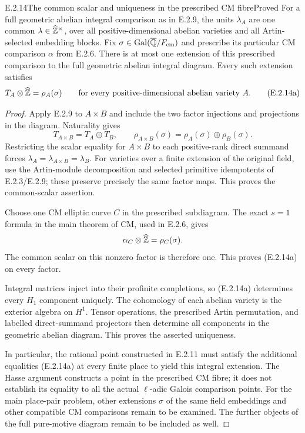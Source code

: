 \begin{result}{E.2.14}{The common scalar and uniqueness in the prescribed CM fibre}{Proved}
For a full geometric abelian integral comparison as in E.2.9,
the units \(\lambda_A\) are one common
\(\lambda\in\widehat{\mathbb Z}^\times\), over all positive-dimensional
abelian varieties and all Artin-selected embedding blocks.
Fix \(\sigma\in\operatorname{Gal}(\overline{\mathbb Q}/F_{\mathrm{cm}})\) and prescribe its
particular CM comparison \(\alpha\) from E.2.6. There is at most
one extension of this prescribed comparison to the full geometric
abelian integral diagram. Every such extension satisfies
\[
 T_A\otimes\widehat{\mathbb Z}=\rho_A(\sigma)
 \qquad\hbox{for every positive-dimensional abelian variety }A.
 \tag{E.2.14a}
\]
\end{result}
\begin{proof}
Apply E.2.9 to \(A\times B\) and include the two factor
injections and projections in the diagram. Naturality gives
\[
 T_{A\times B}=T_A\oplus T_B,\qquad
 \rho_{A\times B}(\sigma)=\rho_A(\sigma)\oplus\rho_B(\sigma).
\]
Restricting the scalar equality for \(A\times B\) to each
positive-rank direct summand forces
\(\lambda_A=\lambda_{A\times B}=\lambda_B\).
For varieties over a finite extension of the original field, use
the Artin-module decomposition and selected primitive idempotents
of E.2.3/E.2.9; these preserve precisely the same factor maps.
This proves the common-scalar assertion.

Choose one CM elliptic curve \(C\) in the prescribed subdiagram.
The exact \(s=1\) formula in the main theorem of CM, used in
E.2.6, gives
\[
 \alpha_C\otimes\widehat{\mathbb Z}=\rho_C(\sigma).
\]
The common scalar on this nonzero factor is therefore one.
This proves (E.2.14a) on every factor.

Integral matrices inject into their profinite completions, so
(E.2.14a) determines every \(H_1\) component uniquely. The
cohomology of each abelian variety is the exterior algebra on
\(H^1\). Tensor operations, the prescribed Artin permutation,
and labelled direct-summand projectors then determine all
components in the geometric abelian diagram. This proves
the asserted uniqueness.

In particular, the rational point constructed in E.2.11 must
satisfy the additional equalities (E.2.14a) at every finite place
to yield this integral extension. The Hasse argument constructs
a point in the prescribed CM fibre; it does not establish its
equality to all the actual \(\ell\)-adic Galois comparison
points. For the main place-pair problem, other extensions
\(\sigma\) of the same field embeddings and other compatible
CM comparisons remain to be examined. The further objects of
the full pure-motive diagram remain to be included as well.
\end{proof}
